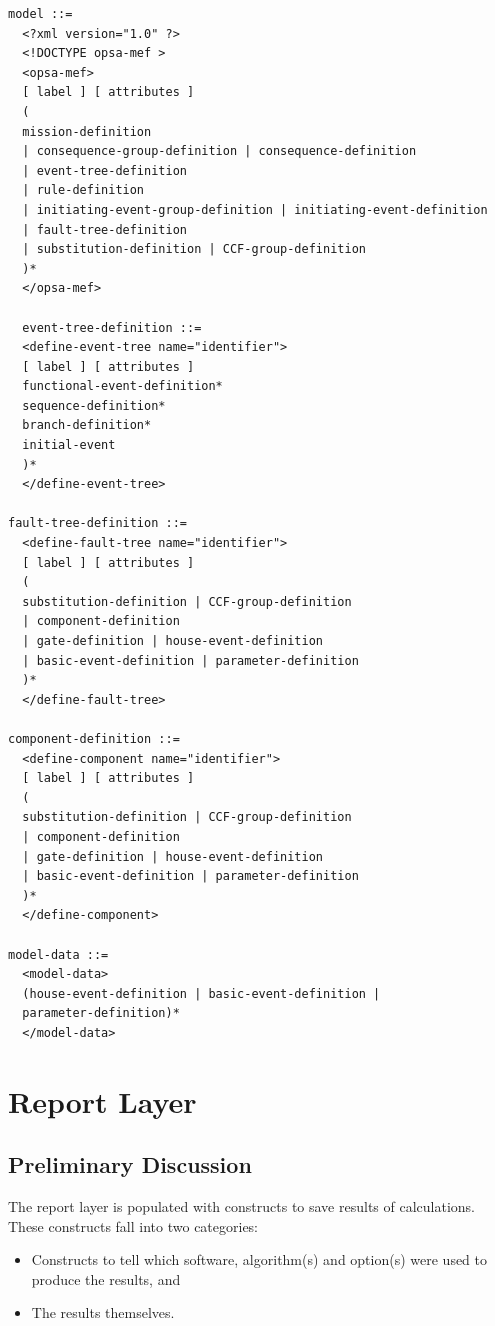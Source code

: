 \documentclass[11pt]{article}
\begin{document}
\begin{lstlisting}
model ::=
  <?xml version="1.0" ?>
  <!DOCTYPE opsa-mef >
  <opsa-mef>
  [ label ] [ attributes ]
  (
  mission-definition
  | consequence-group-definition | consequence-definition
  | event-tree-definition
  | rule-definition
  | initiating-event-group-definition | initiating-event-definition
  | fault-tree-definition
  | substitution-definition | CCF-group-definition
  )*
  </opsa-mef>

  event-tree-definition ::=
  <define-event-tree name="identifier">
  [ label ] [ attributes ]
  functional-event-definition*
  sequence-definition*
  branch-definition*
  initial-event
  )*
  </define-event-tree>

fault-tree-definition ::=
  <define-fault-tree name="identifier">
  [ label ] [ attributes ]
  (
  substitution-definition | CCF-group-definition
  | component-definition
  | gate-definition | house-event-definition
  | basic-event-definition | parameter-definition
  )*
  </define-fault-tree>

component-definition ::=
  <define-component name="identifier">
  [ label ] [ attributes ]
  (
  substitution-definition | CCF-group-definition
  | component-definition
  | gate-definition | house-event-definition
  | basic-event-definition | parameter-definition
  )*
  </define-component>

model-data ::=
  <model-data>
  (house-event-definition | basic-event-definition |
  parameter-definition)*
  </model-data>
\end{lstlisting}

\section{Report Layer}
\label{sec:org0b286cb}


\subsection{Preliminary Discussion}
\label{sec:org5e3b1ff}

The report layer is populated with constructs to save results of
calculations. These constructs fall into two categories:

\begin{itemize}
\item Constructs to tell which software, algorithm(s) and option(s) were
used to produce the results, and

\item The results themselves.
\end{itemize}
\end{document}
